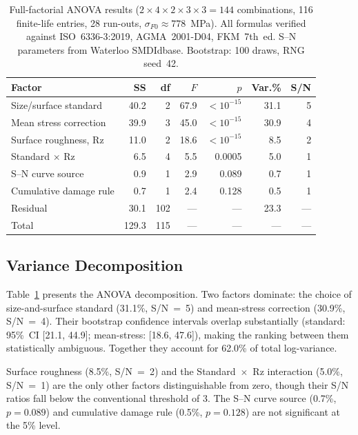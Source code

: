 \documentclass[12pt,a4paper]{article}
\begin{document}
\begin{table}[h]
\centering
\caption{Full-factorial ANOVA results ($2\times4\times2\times3\times3 =
144$ combinations, 116 finite-life entries, 28 run-outs,
$\sigma_{F0}\approx778$~MPa). All formulas verified against
ISO~6336-3:2019, AGMA~2001-D04, FKM~7th~ed. S--N parameters from
Waterloo SMDIdbase. Bootstrap: 100 draws, RNG seed~42.}
\label{tab:anova}
\begin{tabular}{lrrrrrr}
\toprule
Factor & SS & df & $F$ & $p$ & Var.\% & S/N \\
\midrule
Size/surface standard & 40.2 & 2 & 67.9 & $<10^{-15}$ & 31.1 & 5 \\
Mean stress correction & 39.9 & 3 & 45.0 & $<10^{-15}$ & 30.9 & 4 \\
Surface roughness, Rz & 11.0 & 2 & 18.6 & $<10^{-15}$ & 8.5 & 2 \\
Standard $\times$ Rz & 6.5 & 4 & 5.5 & 0.0005 & 5.0 & 1 \\
S--N curve source & 0.9 & 1 & 2.9 & 0.089 & 0.7 & 1 \\
Cumulative damage rule & 0.7 & 1 & 2.4 & 0.128 & 0.5 & 1 \\
\midrule
Residual & 30.1 & 102 & --- & --- & 23.3 & --- \\
Total & 129.3 & 115 & --- & --- & --- & --- \\
\bottomrule
\end{tabular}
\end{table}

\subsection{Variance Decomposition}

Table~\ref{tab:anova} presents the ANOVA decomposition. Two factors
dominate: the choice of size-and-surface standard (31.1\%, S/N~=~5)
and mean-stress correction (30.9\%, S/N~=~4). Their bootstrap
confidence intervals overlap substantially (standard: 95\%~CI
[21.1, 44.9]; mean-stress: [18.6, 47.6]), making the ranking between
them statistically ambiguous. Together they account for 62.0\% of
total log-variance.

Surface roughness (8.5\%, S/N~=~2) and the Standard~$\times$~Rz
interaction (5.0\%, S/N~=~1) are the only other factors distinguishable
from zero, though their S/N ratios fall below the conventional
threshold of 3. The S--N curve source (0.7\%, $p=0.089$) and cumulative
damage rule (0.5\%, $p=0.128$) are not significant at the 5\% level.
\end{document}
